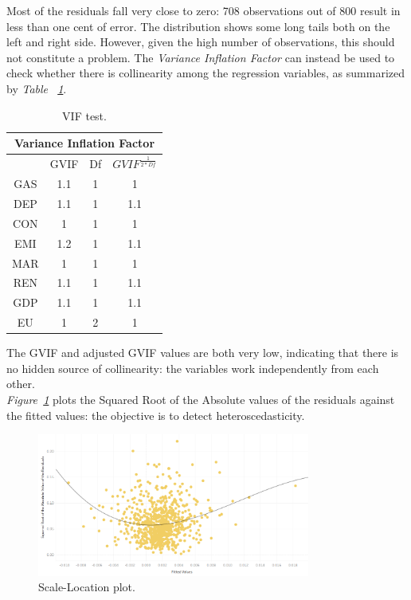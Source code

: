 \documentclass[a4paper,12pt]{book}
\begin{document}
Most of the residuals fall very close to zero: 708 observations out of 800 result in less than one cent of error. The distribution shows some long tails both on the left and right side. However, given the high number of observations, this should not constitute a problem. The \textit{Variance Inflation Factor} can instead be used to check whether there is collinearity among the regression variables, as summarized by \textit{Table ~\ref{Tab:coll}}. 

\begin{table}[tb]
\begin{center}
\begin{tabular}{|c|c|c|c|}
\hline
\multicolumn{4}{|c|}{Variance Inflation Factor}\\
\hline
&GVIF&Df&$GVIF^{\frac{1}{2*Df}}$\\
\hline
GAS&1.1&1&1\\
DEP&1.1&1&1.1\\
CON&1&1&1\\
EMI&1.2&1&1.1\\
MAR&1&1&1\\
REN&1.1&1&1.1\\
GDP&1.1&1&1.1\\
EU&1&2&1\\
\hline
\end{tabular}
\caption{VIF test.}
\label{Tab:coll}
\end{center}
\end{table}

The GVIF and adjusted GVIF values are both very low, indicating that there is no hidden source of collinearity: the variables work independently from each other.\\

\textit{Figure~\ref{fig:hetero}} plots the Squared Root of the Absolute values of the residuals against the fitted values: the objective is to detect heteroscedasticity.

\begin{figure}[tb]
\begin{center}
\captionsetup{justification=centering}
\includegraphics[width=0.8\textwidth]{Images/hetero.png}
\caption{Scale-Location plot.}
\label{fig:hetero}
\end{center}
\end{figure}
\end{document}
